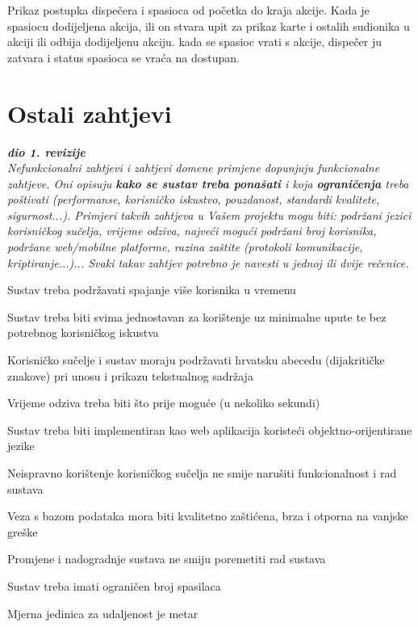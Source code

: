 				Prikaz postupka dispečera i spasioca od početka do kraja akcije. Kada je spasiocu dodijeljena akcija, ili on stvara upit za prikaz karte i ostalih sudionika u akciji ili odbija dodijeljenu akciju. kada se spasioc vrati s akcije, dispečer ju zatvara i status spasioca se vraća na dostupan.
				
				\eject
	
		\section{Ostali zahtjevi}
		
			\textbf{\textit{dio 1. revizije}}\\
		 
			 \textit{Nefunkcionalni zahtjevi i zahtjevi domene primjene dopunjuju funkcionalne zahtjeve. Oni opisuju \textbf{kako se sustav treba ponašati} i koja \textbf{ograničenja} treba poštivati (performanse, korisničko iskustvo, pouzdanost, standardi kvalitete, sigurnost...). Primjeri takvih zahtjeva u Vašem projektu mogu biti: podržani jezici korisničkog sučelja, vrijeme odziva, najveći mogući podržani broj korisnika, podržane web/mobilne platforme, razina zaštite (protokoli komunikacije, kriptiranje...)... Svaki takav zahtjev potrebno je navesti u jednoj ili dvije rečenice.}

			
			\begin{packed_item}
			\item  Sustav treba podržavati spajanje više korisnika u vremenu
			\item  Sustav treba biti svima jednostavan za korištenje uz minimalne upute te bez potrebnog korisničkog iskustva
			\item  Korisničko sučelje i sustav moraju podržavati hrvatsku abecedu (dijakritičke znakove) pri unosu i prikazu tekstualnog sadržaja
			\item  Vrijeme odziva treba biti što prije moguće (u nekoliko sekundi)
			\item  Sustav treba biti implementiran kao web aplikacija koristeći objektno-orijentirane jezike
			\item  Neispravno korištenje korisničkog sučelja ne smije narušiti funkcionalnost i rad sustava
			\item  Veza s bazom podataka mora biti kvalitetno zaštićena, brza i otporna na vanjske greške
			\item  Promjene i nadogradnje sustava ne smiju poremetiti rad sustava
			\item  Sustav treba imati ograničen broj spasilaca
			\item  Mjerna jedinica za udaljenost je metar
			 \end{packed_item}
			 
			 
	